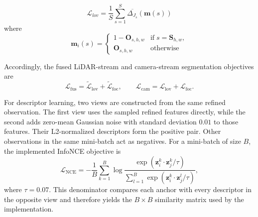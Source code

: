 \begin{equation}
	\mathcal{L}_{lov} = \frac{1}{S}\sum_{s=1}^{S}\overline{\Delta_{J_s}}(\mathbf{m}(s))
\end{equation}
where
\begin{equation}
	\mathbf{m}_i(s) = \begin{cases}
		1 - \mathbf{O}_{s,h,w}  & \text{if} \; s = \mathbf{S}_{h,w}, \\
		\mathbf{O}_{s,h,w} & \text{otherwise}
	\end{cases} 
\end{equation}

Accordingly, the fused LiDAR-stream and camera-stream segmentation objectives are
\begin{equation}
	\mathcal{L}_{\mathrm{fus}}
	=
	\mathcal{\tilde{L}}_{\mathrm{lov}}
	+\mathcal{\tilde{L}}_{\mathrm{foc}},
	\qquad
	\mathcal{L}_{\mathrm{cam}}
	=
	\mathcal{L}_{\mathrm{lov}}
	+\mathcal{L}_{\mathrm{foc}}.
\end{equation}

For descriptor learning, two views are constructed from the same refined observation. The first view uses the sampled refined features directly, while the second adds zero-mean Gaussian noise with standard deviation $0.01$ to those features. Their L2-normalized descriptors form the positive pair. Other observations in the same mini-batch act as negatives. For a mini-batch of size $B$, the implemented InfoNCE objective is
\begin{equation}
	\mathcal{L}_{\mathrm{NCE}}
	=
	-\frac{1}{B}\sum_{k=1}^{B}
	\log
	\frac{
	\exp\!\left(\mathbf{z}^{k}_{i}\cdot\mathbf{z}^{k}_{j}/\tau\right)}
	{\sum_{l=1}^{B}
	\exp\!\left(\mathbf{z}^{k}_{i}\cdot\mathbf{z}^{l}_{j}/\tau\right)},
	\label{eq:contrastive-loss}
\end{equation}
where $\tau=0.07$. This denominator compares each anchor with every descriptor in the opposite view and therefore yields the $B\times B$ similarity matrix used by the implementation.

